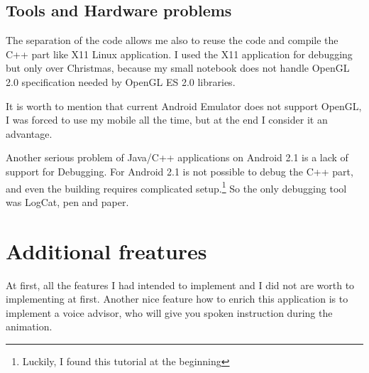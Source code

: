 \subsection*{Tools and Hardware problems} %
The separation of the code allows me also to reuse the code and compile 
the C++ part like X11 Linux application. I used the X11 application for debugging
but only over Christmas, because my small notebook does not handle OpenGL 2.0 specification
needed by OpenGL ES 2.0 libraries.

It is worth to mention that current Android Emulator does not support OpenGL, 
I was forced to use my mobile all the time, 
but at the end I consider it an advantage.

Another serious problem of Java/C++ applications on Android 2.1 is a lack of support for Debugging.
For Android 2.1 is not possible to debug the C++ part, 
and even the building requires complicated setup.\footnote{Luckily, I found this tutorial at the beginning }
So the only debugging tool was LogCat, pen and paper.

\section*{Additional freatures} %
\label{sec:Additional freatures}
At first, all the features I had intended to implement and I did not are worth to implementing at first.
Another nice feature how to enrich this application is to implement
a voice advisor, who will give you spoken instruction during the animation.

